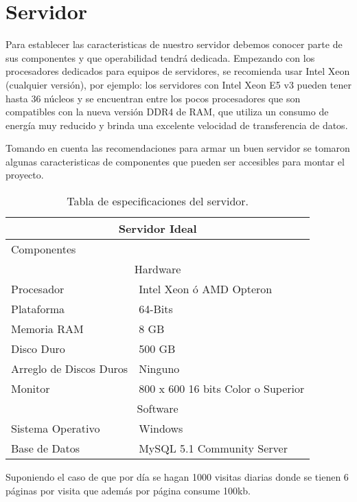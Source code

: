 	

	\section{Servidor}
	\noindent Para establecer las caracteristicas de nuestro servidor debemos conocer parte de sus componentes y que operabilidad tendrá dedicada.
	Empezando con los procesadores dedicados para equipos de servidores, se recomienda usar Intel Xeon (cualquier versión), por ejemplo: los servidores con Intel Xeon E5 v3 pueden tener hasta 36 núcleos y se encuentran entre los pocos procesadores que son compatibles con la nueva versión DDR4 de RAM, que utiliza un consumo de energía muy reducido y brinda una excelente velocidad de transferencia de datos.\cite{serv}
	
	\noindent Tomando en cuenta las recomendaciones para armar un buen servidor se tomaron algunas caracteristicas de componentes que pueden ser accesibles para montar el proyecto. \cite{serv}\cite{servi}
	
	\begin{table}[htbp]
		\begin{center}
			\begin{tabular}{|l|l|}
				\hline
				\multicolumn{2}{|c|}{Servidor Ideal} \\
				\hline
				Componentes & \\
				\hline
				\multicolumn{2}{|c|}{Hardware} \\
				\hline
				Procesador & Intel Xeon ó AMD Opteron\\
				\hline
				Plataforma & 64-Bits\\
				\hline
				Memoria RAM & 8 GB\\
				\hline
				Disco Duro & 500 GB\\
				\hline
				Arreglo de Discos Duros & Ninguno\\
				\hline
				Monitor & 800 x 600 16 bits Color o Superior\\
				\hline
				\multicolumn{2}{|c|}{Software} \\
				\hline
				Sistema Operativo & Windows \\
				\hline
				Base de Datos & MySQL 5.1 Community Server\\
				\hline
			\end{tabular}
			\caption{Tabla de especificaciones del servidor.}
		\end{center}
	\end{table}
\pagebreak
\noindent Suponiendo el caso de que por día se hagan 1000 visitas diarias donde se tienen 6 páginas por visita que además por página consume 100kb.

